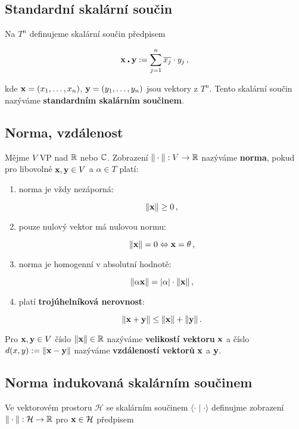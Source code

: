 \subsection*{Standardní skalární součin}

Na $T^{n}$ definujeme skalární součin předpisem

\[ \mathbf{x}\centerdot \mathbf{y}:=\sum_{j=1}^{n}\overline{x_j}\cdot y_{j}\,, \]

\noindent kde $\mathbf{x}=(x_1,\dots,x_n)$, $\mathbf{y}=(y_1,\dots,y_n)$ jsou vektory z $T^n$. Tento skalární součin nazýváme \textbf{standardním skalárním součinem}.

\subsection*{Norma, vzdálenost}

Mějme $V$ VP nad $\mathbb{R}$ nebo $\mathbb{C}$. Zobrazení $\|\cdot\|:V\to \mathbb{R}$ nazýváme
\textbf{norma}, pokud pro libovolné $\mathbf{x}, \mathbf{y} \in V$ a $\alpha\in T$ platí:

\begin{enumerate}
    \item norma je vždy nezáporná:

          \[ \|\mathbf{x}\|\geq0 \,, \]

    \item pouze nulový vektor má nulovou normu:

          \[ \|\mathbf{x}\|=0 \Leftrightarrow \mathbf{x}=\theta\,, \]

    \item norma je homogenní v absolutní hodnotě:

          \[ \|\alpha \mathbf{x}\|=|\alpha|\cdot\|\mathbf{x}\|\,, \]

    \item platí \textbf{trojúhelníková nerovnost}:

          \[ \|\mathbf{x}+\mathbf{y}\|\leq\|\mathbf{x}\|+\|\mathbf{y}\|\,. \]

\end{enumerate}

\noindent Pro $\mathbf{x}, \mathbf{y}\in V$ číslo $\|\mathbf{x}\|\in \mathbb{R}$ nazýváme \textbf{velikostí vektoru} $\mathbf{x}$ a číslo $d(x,y):=\|\mathbf{x}-\mathbf{y}\|$ nazýváme \textbf{vzdáleností vektorů} $\mathbf{x}$
a $\mathbf{y}$.

\subsection*{Norma indukovaná skalárním součinem}

Ve vektorovém prostoru $\mathcal H$ se skalárním součinem
$\langle\cdot\mid\cdot\rangle$ definujme zobrazení $\|\cdot\|: \mathcal H\to
    \mathbb{R}$ pro $\mathbf{x}\in \mathcal H$ předpisem

